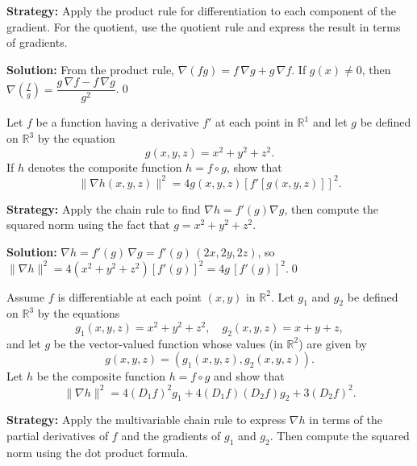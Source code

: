 \noindent\textbf{Strategy:} Apply the product rule for differentiation to each component of the gradient. For the quotient, use the quotient rule and express the result in terms of gradients.

\bigskip\noindent\textbf{Solution:}
From the product rule, $\nabla(fg)=f\,\nabla g+g\,\nabla f$. If $g(x)\ne0$, then $\nabla\!\left(\frac{f}{g}\right)=\dfrac{g\,\nabla f-f\,\nabla g}{g^2}$.\qed


\begin{problembox}
\begin{problemstatement}
Let \( f \) be a function having a derivative \( f' \) at each point in \( \mathbb{R}^1 \) and let \( g \) be defined on \( \mathbb{R}^3 \) by the equation
\[g(x, y, z) = x^2 + y^2 + z^2.\]
If \( h \) denotes the composite function \( h = f \circ g \), show that
\[\| \nabla h(x, y, z) \|^2 = 4g(x, y, z)[f'[g(x, y, z)]]^2.\]
\end{problemstatement}
\end{problembox}

\noindent\textbf{Strategy:} Apply the chain rule to find \( \nabla h = f'(g) \nabla g \), then compute the squared norm using the fact that \( g = x^2 + y^2 + z^2 \).

\bigskip\noindent\textbf{Solution:}
$\nabla h=f'(g)\,\nabla g=f'(g)\,(2x,2y,2z)$, so $\|\nabla h\|^2=4(x^2+y^2+z^2)[f'(g)]^2=4g\,[f'(g)]^2$.\qed


\begin{problembox}
\begin{problemstatement}
Assume \( f \) is differentiable at each point \( (x, y) \) in \( \mathbb{R}^2 \). Let \( g_1 \) and \( g_2 \) be defined on \( \mathbb{R}^3 \) by the equations
\[g_1(x, y, z) = x^2 + y^2 + z^2, \quad g_2(x, y, z) = x + y + z,\]
and let \( g \) be the vector-valued function whose values (in \( \mathbb{R}^2 \)) are given by
\[g(x, y, z) = (g_1(x, y, z), g_2(x, y, z)).\]
Let \( h \) be the composite function \( h = f \circ g \) and show that
\[\| \nabla h \|^2 = 4(D_1f)^2g_1 + 4(D_1f)(D_2f)g_2 + 3(D_2f)^2.\]
\end{problemstatement}
\end{problembox}

\noindent\textbf{Strategy:} Apply the multivariable chain rule to express \( \nabla h \) in terms of the partial derivatives of \( f \) and the gradients of \( g_1 \) and \( g_2 \). Then compute the squared norm using the dot product formula.

